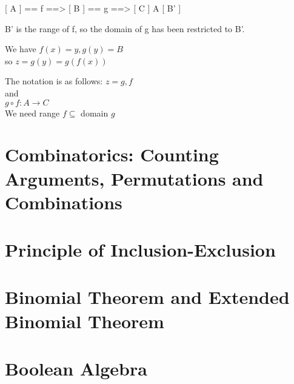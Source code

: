 [ A ] == f ==> [ B  ] == g ==> [ C ]
  A            [ B' ]

B' is the range of f, so the domain of g has been restricted to B'.

We have $f(x) = y, g(y) = B$ \\
so $z = g(y) = g(f(x))$

The notation is as follows:  $z = g,f$ \\
and \\
$g \circ f: A \to C$ \\
We need range $f \subseteq$ domain $g$

\section{Combinatorics: Counting Arguments, Permutations and Combinations}
\label{sec:Combinatorics}

\section{Principle of Inclusion-Exclusion}
\label{sec:InclusionExclusion}

\section{Binomial Theorem and Extended Binomial Theorem}
\label{sec:BinomialTheorem}

\section{Boolean Algebra}
\label{sec:BooleanAlgebra}

